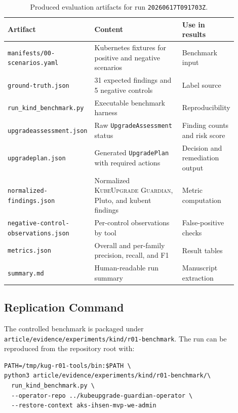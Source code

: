 \documentclass[10pt,journal]{IEEEtran}
\newcommand{\tool}{\textsc{KubeUpgrade Guardian}}
\newcommand{\crd}[1]{\texttt{#1}}
\newcommand{\code}[1]{\texttt{#1}}
\begin{document}
\begin{table}[t]
  \centering
  \caption{Produced evaluation artifacts for run \code{20260617T091703Z}.}
  \label{tab:produced-artifacts}
  \begin{tabular}{p{0.28\linewidth}p{0.42\linewidth}p{0.20\linewidth}}
    \toprule
    Artifact & Content & Use in results \\
    \midrule
    \code{manifests/00-scenarios.yaml} & Kubernetes fixtures for positive and negative scenarios & Benchmark input \\
    \code{ground-truth.json} & 31 expected findings and 5 negative controls & Label source \\
    \code{run\_kind\_benchmark.py} & Executable benchmark harness & Reproducibility \\
    \code{upgradeassessment.json} & Raw \crd{UpgradeAssessment} status & Finding counts and risk score \\
    \code{upgradeplan.json} & Generated \crd{UpgradePlan} with required actions & Decision and remediation output \\
    \code{normalized-findings.json} & Normalized \tool{}, Pluto, and kubent findings & Metric computation \\
    \code{negative-control-observations.json} & Per-control observations by tool & False-positive checks \\
    \code{metrics.json} & Overall and per-family precision, recall, and F1 & Result tables \\
    \code{summary.md} & Human-readable run summary & Manuscript extraction \\
    \bottomrule
  \end{tabular}
\end{table}

\subsection{Replication Command}
The controlled benchmark is packaged under \code{article/evidence/experiments/kind/r01-benchmark}. The run can be reproduced from the repository root with:

{\scriptsize
\begin{verbatim}
PATH=/tmp/kug-r01-tools/bin:$PATH \
python3 article/evidence/experiments/kind/r01-benchmark/\
  run_kind_benchmark.py \
  --operator-repo ../kubeupgrade-guardian-operator \
  --restore-context aks-ihsen-mvp-we-admin
\end{verbatim}
}
\end{document}
